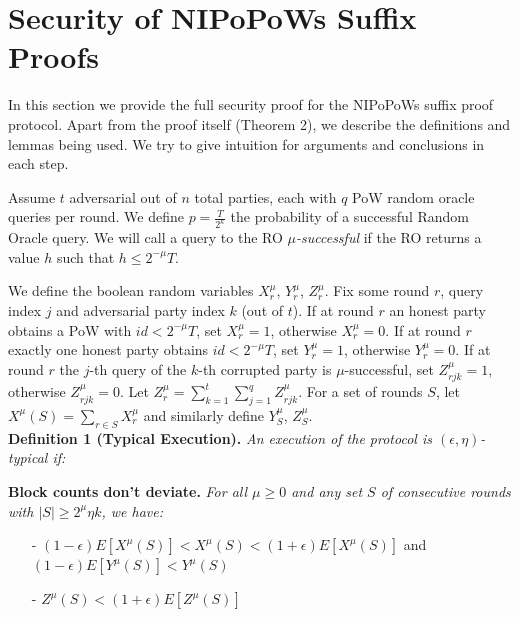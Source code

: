 \documentclass[9pt,a4paper]{article}
\begin{document}

\section{Security of NIPoPoWs Suffix Proofs} \label{proof_under_hard_fork}

In this section we provide the full security proof for the NIPoPoWs suffix proof protocol\cite{NIPoPoWs}. Apart from the proof itself (Theorem 2), we describe the definitions and lemmas being used. We try to give intuition for arguments and conclusions in each step.

Assume $t$ adversarial out of $n$ total parties, each with $q$ PoW random oracle queries per round. We define $p = \frac{T}{2^\kappa}$ the probability of a successful Random Oracle query. We will call a query to the RO $\mu$\textit{-successful} if the RO returns a value $h$ such that $h \leq 2^{-\mu}T$.

We define the boolean random variables $X_r^{\mu}$, $Y_r^{\mu}$, $Z_r^{\mu}$. Fix some round $r$, query index $j$ and adversarial party index $k$ (out of $t$). If at round $r$ an honest party obtains a PoW with $id < 2^{-\mu}T$, set $X_r^{\mu} = 1$, otherwise $X_r^{\mu} = 0$. If at round $r$ exactly one honest party obtains $id < 2^{-\mu}T$, set $Y_r^{\mu} = 1$, otherwise $Y_r^{\mu} = 0$. If at round $r$ the $j$-th query of the $k$-th corrupted party is $\mu$-successful, set $Z_{rjk}^{\mu} = 1$, otherwise $Z_{rjk}^{\mu} = 0$. Let $Z_r^{\mu} = \sum_{k=1}^t\sum_{j=1}^qZ_{rjk}^{\mu}$. For a set of rounds $S$, let $X^\mu(S) = \sum_{r \in S}X^{\mu}_r$ and similarly define $Y_S^{\mu}$, $Z_S^{\mu}$.\\

\textbf{Definition 1 (Typical Execution).} \textit{An execution of the protocol is $(\epsilon, \eta)$-typical if:}

\textbf{Block counts don't deviate.} \textit{For all $\mu \geq 0$ and any set $S$ of consecutive rounds with $\vert S \vert \geq 2^\mu \eta k$, we have:}
\begin{itemize}
\item[-] $(1-\epsilon)E[X^\mu(S)] < X^\mu(S) < (1+\epsilon)E[X^\mu(S)] $ and $(1-\epsilon)E[Y^\mu(S)] < Y^\mu(S)$
\item[-] $Z^\mu(S) < (1+\epsilon)E[Z^\mu(S)]$
\end{itemize}
\end{document}
